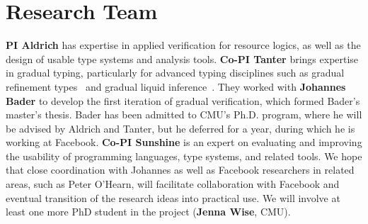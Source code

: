 \documentclass[10pt,twocolumn]{article}
\begin{document}
\begin{sloppypar}
\section{Research Team}
\vspace{-2ex}

\textbf{PI Aldrich} has expertise in applied verification for resource logics, as well as the design of usable type systems and analysis tools.  \textbf{Co-PI Tanter} brings expertise in gradual typing, particularly for advanced typing disciplines such as gradual refinement types~\cite{lehmannTanter:popl2017} and gradual liquid inference~\cite{vazouAl:oopsla2018}.  They worked with \textbf{Johannes Bader} to develop the first iteration of gradual verification, which formed Bader's master's thesis.  Bader has been admitted to CMU's Ph.D. program, where he will be advised by Aldrich and Tanter, but he deferred for a year, during which he is working at Facebook.  \textbf{Co-PI Sunshine} is an expert on evaluating and improving the usability of programming languages, type systems, and related tools.  We hope that close coordination with Johannes as well as Facebook researchers in related areas, such as Peter O'Hearn, will facilitate collaboration with Facebook and eventual transition of the research ideas into practical use. We will involve at least one more PhD student in the project (\textbf{Jenna Wise}, CMU).




\end{sloppypar}
\end{document}

